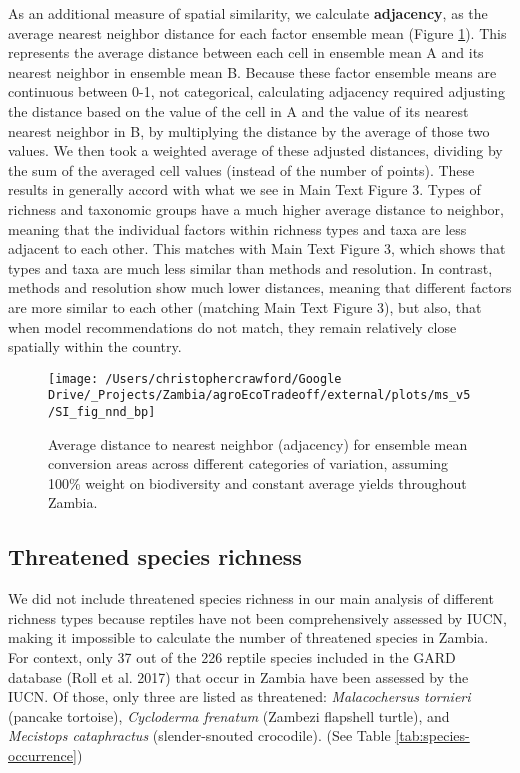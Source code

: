 \documentclass[
]{article}
\begin{document}
As an additional measure of spatial similarity, we calculate \textbf{adjacency}, as the average nearest neighbor distance for each factor ensemble mean (Figure \ref{fig:nnd-fig}). This represents the average distance between each cell in ensemble mean A and its nearest neighbor in ensemble mean B. Because these factor ensemble means are continuous between 0-1, not categorical, calculating adjacency required adjusting the distance based on the value of the cell in A and the value of its nearest nearest neighbor in B, by multiplying the distance by the average of those two values. We then took a weighted average of these adjusted distances, dividing by the sum of the averaged cell values (instead of the number of points). These results in generally accord with what we see in Main Text Figure 3. Types of richness and taxonomic groups have a much higher average distance to neighbor, meaning that the individual factors within richness types and taxa are less adjacent to each other. This matches with Main Text Figure 3, which shows that types and taxa are much less similar than methods and resolution. In contrast, methods and resolution show much lower distances, meaning that different factors are more similar to each other (matching Main Text Figure 3), but also, that when model recommendations do not match, they remain relatively close spatially within the country.



\begin{figure}
\texttt{[image: /Users/christophercrawford/Google Drive/\_Projects/Zambia/agroEcoTradeoff/external/plots/ms\_v5/SI\_fig\_nnd\_bp]} \caption{Average distance to nearest neighbor (adjacency) for ensemble mean conversion areas across different categories of variation, assuming 100\% weight on biodiversity and constant average yields throughout Zambia.}\label{fig:nnd-fig}
\end{figure}

\newpage

\hypertarget{section-threat}{%
\subsection{Threatened species richness}\label{section-threat}}

We did not include threatened species richness in our main analysis of different richness types because reptiles have not been comprehensively assessed by IUCN, making it impossible to calculate the number of threatened species in Zambia. For context, only 37 out of the 226 reptile species included in the GARD database (Roll et al. 2017) that occur in Zambia have been assessed by the IUCN. Of those, only three are listed as threatened: \emph{Malacochersus tornieri} (pancake tortoise), \emph{Cycloderma frenatum} (Zambezi flapshell turtle), and \emph{Mecistops cataphractus} (slender-snouted crocodile). (See Table \ref{tab:species-occurrence})
\end{document}
